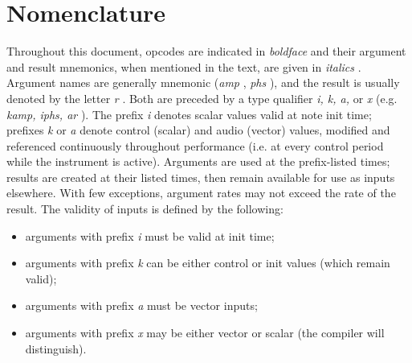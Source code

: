 \begin{comment}
\documentclass[10pt]{article}
\usepackage{fullpage, graphicx, url}
\setlength{\parskip}{1ex}
\setlength{\parindent}{0ex}
\title{Nomenclature}



\begin{tabular}{ccc}
The Alternative Csound Reference Manual & & \\
Previous &Syntax of the Orchestra &Next

\end{tabular}

\end{comment}
\section{Nomenclature}


  Throughout this document, opcodes are indicated in \emph{boldface}
 and their argument and result mnemonics, when mentioned in the text, are given in \emph{italics}
. Argument names are generally mnemonic (\emph{amp}
, \emph{phs}
), and the result is usually denoted by the letter \emph{r}
. Both are preceded by a type qualifier \emph{i, k, a,}
 or \emph{x}
 (e.g. \emph{kamp, iphs, ar}
). The prefix \emph{i}
 denotes scalar values valid at note init time; prefixes \emph{k}
 or \emph{a}
 denote control (scalar) and audio (vector) values, modified and referenced continuously throughout performance (i.e. at every control period while the instrument is active). Arguments are used at the prefix-listed times; results are created at their listed times, then remain available for use as inputs elsewhere. With few exceptions, argument rates may not exceed the rate of the result. The validity of inputs is defined by the following: 


 
\begin{itemize}
\item 

 arguments with prefix \emph{i}
 must be valid at init time;

\item 

 arguments with prefix \emph{k}
 can be either control or init values (which remain valid);

\item 

 arguments with prefix \emph{a}
 must be vector inputs;

\item 

 arguments with prefix \emph{x}
 may be either vector or scalar (the compiler will distinguish).


\end{itemize}


